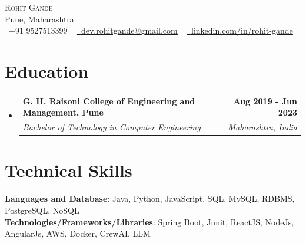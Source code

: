\documentclass[letterpaper,11pt]{article}
\makeatletter
\newcommand{\resumeSubheading}[4]{
  \vspace{-2pt}\item
	\begin{tabular*}{1.0\textwidth}[t]{l@{\extracolsep{\fill}}r}
  	\textbf{#1} & \textbf{\small #2} \\
  	\textit{\small#3} & \textit{\small #4} \\
	\end{tabular*}\vspace{-7pt}
}
\newcommand{\resumeSubHeadingListStart}{\begin{itemize}[leftmargin=0.0in, label={}]}
\newcommand{\resumeSubHeadingListEnd}{\end{itemize}}
\makeatother
\begin{document}
\begin{center}
	{\Huge \scshape \color{accent}Rohit Gande} \\ \vspace{1pt}
	\color{black}Pune, Maharashtra \\ \vspace{1pt}
	\small \raisebox{-0.1\height}\faPhone\ +91 9527513399 ~ \href{mailto:dev.rohitgande@gmail.com}{\raisebox{-0.2\height}\faEnvelope\  \underline{dev.rohitgande@gmail.com}} ~
	\href{https://linkedin.com/in/rohit-gande}{\raisebox{-0.2\height}\faLinkedin\ \underline{linkedin.com/in/rohit-gande}}
	\vspace{-8pt}
\end{center}

\section{Education}
  \resumeSubHeadingListStart
	\resumeSubheading
  	{G. H. Raisoni College of Engineering and Management, Pune}{Aug 2019 - Jun 2023}
  	{Bachelor of Technology in Computer Engineering}{Maharashtra, India}
  \resumeSubHeadingListEnd

\section{Technical Skills}
 \begin{itemize}[leftmargin=0.15in, label={}]
	\small{\item{
 	\textbf{Languages and Database}{: Java, Python, JavaScript, SQL, MySQL, RDBMS, PostgreSQL, NoSQL} \\
 	\textbf{Technologies/Frameworks/Libraries}{: Spring Boot, Junit, ReactJS, NodeJs, AngularJs, AWS, Docker, CrewAI, LLM}
	}}
 \end{itemize}
 \vspace{-16pt}
\end{document}
